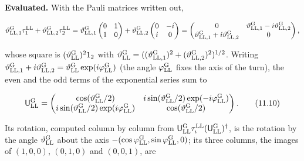 \documentclass[
  10pt,
]{article}
\begin{document}
\textbf{Evaluated.} With the Pauli matrices written out,

\[\vartheta^{\rm G}_{{\rm LL},1}\tau^{\rm LL}_1+\vartheta^{\rm G}_{{\rm LL},2}\tau^{\rm LL}_2=\vartheta^{\rm G}_{{\rm LL},1}\begin{pmatrix}0&1\\1&0\end{pmatrix}+\vartheta^{\rm G}_{{\rm LL},2}\begin{pmatrix}0&-i\\i&0\end{pmatrix}=\begin{pmatrix}0&\vartheta^{\rm G}_{{\rm LL},1}-i\vartheta^{\rm G}_{{\rm LL},2}\\\vartheta^{\rm G}_{{\rm LL},1}+i\vartheta^{\rm G}_{{\rm LL},2}&0\end{pmatrix},\]

whose square is \((\vartheta^{\rm G}_{\rm LL})^2\mathsf 1_2\) with
\(\vartheta^{\rm G}_{\rm LL}=((\vartheta^{\rm G}_{{\rm LL},1})^2+(\vartheta^{\rm G}_{{\rm LL},2})^2)^{1/2}\).
Writing
\(\vartheta^{\rm G}_{{\rm LL},1}+i\vartheta^{\rm G}_{{\rm LL},2}=\vartheta^{\rm G}_{\rm LL}\exp(i\varphi^{\rm G}_{\rm LL})\)
(the angle \(\varphi^{\rm G}_{\rm LL}\) fixes the axis of the turn), the
even and the odd terms of the exponential series sum to

\[\mathsf U^{\rm G}_{\rm LL}=\begin{pmatrix}\cos(\vartheta^{\rm G}_{\rm LL}/2)&i\sin(\vartheta^{\rm G}_{\rm LL}/2)\exp(-i\varphi^{\rm G}_{\rm LL})\\i\sin(\vartheta^{\rm G}_{\rm LL}/2)\exp(i\varphi^{\rm G}_{\rm LL})&\cos(\vartheta^{\rm G}_{\rm LL}/2)\end{pmatrix}.\tag{11.10}\]

Its rotation, computed column by column from
\(\mathsf U^{\rm G}_{\rm LL}\tau^{\rm LL}_\iota(\mathsf U^{\rm G}_{\rm LL})^\dagger\),
is the rotation by the angle \(\vartheta^{\rm G}_{\rm LL}\) about the
axis \(-(\cos\varphi^{\rm G}_{\rm LL},\sin\varphi^{\rm G}_{\rm LL},0)\);
its three columns, the images of \((1,0,0)\), \((0,1,0)\) and
\((0,0,1)\), are
\end{document}
